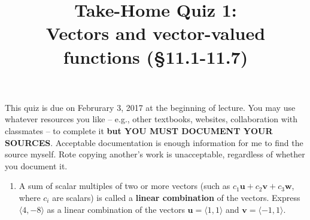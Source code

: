 \documentclass[%
]{article}
\title{\vspace{-3.5pc} 
	\flushleft \bf \Large Take-Home Quiz 1: \\ Vectors and vector-valued functions (\S 11.1-11.7)}
\date{}
\newcommand{\vect}[1]{\mathbf{#1}}
\begin{document}
\maketitle

\vspace{-3pc}
 This quiz is due on Februrary 3, 2017 at the beginning of lecture.  You may use whatever resources you like -- e.g., other textbooks, websites, collaboration with classmates -- to complete it \textbf{but YOU MUST DOCUMENT YOUR SOURCES}.  Acceptable documentation is enough information for me to find the source myself.  Rote copying another's work is unacceptable, regardless of whether you document it.  

\noindent\hrulefill

\begin{enumerate}


\item %
A sum of scalar multiples of two or more vectors (such as $c_1\vect u+c_2\vect v+c_3\vect w$, where $c_i$ are scalars) is called a \textbf{linear combination} of the vectors.  Express $\langle 4,-8\rangle$ as a linear combination of the vectors $\vect u=\langle 1,1\rangle$ and $\vect v=\langle -1,1\rangle$. 





\end{enumerate}
\end{document}

